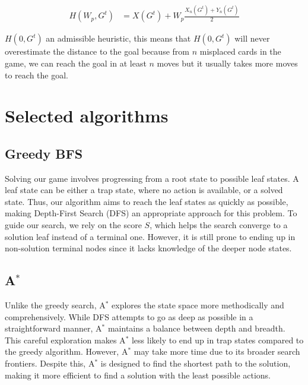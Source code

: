 \begin{align}
H\left(W_p, G^t\right) &= X\left(G^t\right) + W_p\frac{X_n\left(G^t\right) + Y_n\left(G^t\right)}{2}
\end{align}

$H\left(0, G^t\right)$ an admissible heuristic, this means that $H\left(0, G^t\right)$ will never overestimate the distance to the goal because from $n$ misplaced cards in the game, we can reach the goal in at least $n$ moves but it usually takes more moves to reach the goal.


\section{Selected algorithms}
\subsection{Greedy BFS}
Solving our game involves progressing from a root state to possible leaf states. A leaf state can be either a trap state, where no action is available, or a solved state. Thus, our algorithm aims to reach the leaf states as quickly as possible, making Depth-First Search (DFS) an appropriate approach for this problem. To guide our search, we rely on the score $S$, which helps the search converge to a solution leaf instead of a terminal one. However, it is still prone to ending up in non-solution terminal nodes since it lacks knowledge of the deeper node states.

\subsection{A$^*$}
Unlike the greedy search, A$^*$ explores the state space more methodically and comprehensively. While DFS attempts to go as deep as possible in a straightforward manner, A$^*$ maintains a balance between depth and breadth. This careful exploration makes A$^*$ less likely to end up in trap states compared to the greedy algorithm. However, A$^*$ may take more time due to its broader search frontiers. Despite this, A$^*$ is designed to find the shortest path to the solution, making it more efficient to find a solution with the least possible actions.

